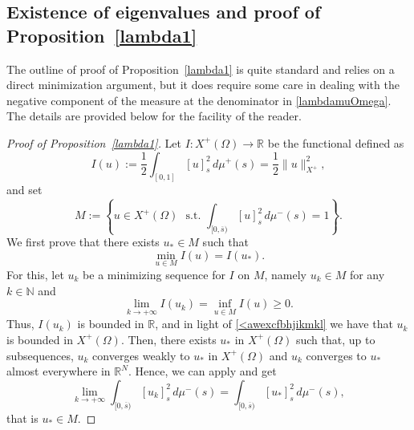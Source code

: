 \documentclass[12pt,a4paper,intlimits,sumlimits]{amsart}
\def \N {\mathbb{N}}
\def \R {\mathbb{R}}
\theoremstyle{definition}
\theoremstyle{plain}
\numberwithin{equation}{section}
\renewcommand{\geq}{\geqslant}
\begin{document}
\begin{appendix}
\section{Existence of eigenvalues and proof of Proposition~\ref{lambda1}}
The outline of proof of
Proposition~\ref{lambda1} is quite standard
and relies on a direct minimization argument, but it does require some care in dealing with the negative component of the measure at the denominator in \eqref{lambdamuOmega}. The details are provided below for the facility of the reader.
\begin{proof}[Proof of Proposition~\ref{lambda1}]
Let $I:X^+(\Omega) \to \R$ be the functional defined as
\begin{equation}\label{<awexcfbhjikmkl}
I(u):=\frac{1}{2}\int_{[0, 1]} [u]^2_s \, d\mu^+(s)=\frac{1}{2}\|u\|_{X^+}^2,
\end{equation}
and set
\[
M:=\left\{u\in X^+(\Omega)\,\, \mbox{ s.t. }\int_{[0, \overline s)} [u]^2_s \, d\mu^-(s)=1 \right\}.
\]
We first prove that there exists $u_*\in M$ such that
\begin{equation}\label{<awexcfbhjikmklclaim}
\min_{u\in M} I(u)=I(u_*).
\end{equation}
For this, let $u_k$ be a minimizing sequence for $I$ on $M$, namely
$u_k\in M$ for any $k\in \N$ and 
\begin{equation}\label{<awexcfbhjikmkl1}
\lim_{k\to+\infty}I(u_k)=\inf_{u\in M} I(u)\geq 0.
\end{equation}
Thus, $I(u_k)$ is bounded in $\R$, and in light of \eqref{<awexcfbhjikmkl} we have that $u_k$ is bounded in $X^+(\Omega)$.
Then,  there exists $u_*$ in $X^+(\Omega)$ such that, up to subsequences, $u_k$ converges weakly to $u_*$ in $X^+(\Omega)$ and $u_k$ converges to $u_*$ almost everywhere in $\R^N$.
Hence, we can apply \cite[Lemma 2.8]{DPLSVlog} and get
\[
\lim_{k\to+\infty}\int_{[0, \overline s)} [u_k]^2_s \, d\mu^-(s)=\int_{[0, \overline s)} [u_*]^2_s \, d\mu^-(s),
\]
that is $u_*\in M$. 


\end{proof}
\end{appendix}
\end{document}
